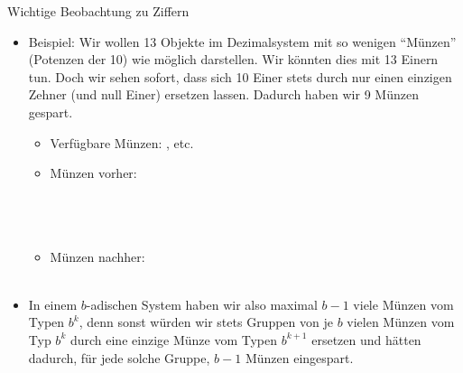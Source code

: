 \begin{frame}{Wichtige Beobachtung zu Ziffern}
\begin{itemize}[<+->]
\item Beispiel: Wir wollen 13 Objekte im Dezimalsystem mit so wenigen \enquote{Münzen} (Potenzen der 10) wie möglich darstellen. Wir könnten dies mit 13 Einern tun. Doch wir sehen sofort, dass sich 10 Einer stets durch nur einen einzigen Zehner (und null Einer) ersetzen lassen. Dadurch haben wir 9 Münzen gespart.
\begin{itemize}
    \item Verfügbare Münzen: ,  etc.
    \item Münzen vorher:\\
    \\
    \\
    \\
    \item Münzen nachher:\\
    \\
\end{itemize}
\item In einem $b$-adischen System haben wir also maximal $b-1$ viele Münzen vom Typen $b^k$, denn sonst würden wir stets Gruppen von je $b$ vielen Münzen vom Typ $b^k$ durch eine einzige Münze vom Typen $b^{k+1}$ ersetzen und hätten dadurch, für jede solche Gruppe, $b-1$ Münzen eingespart.
\end{itemize}

\end{frame}



